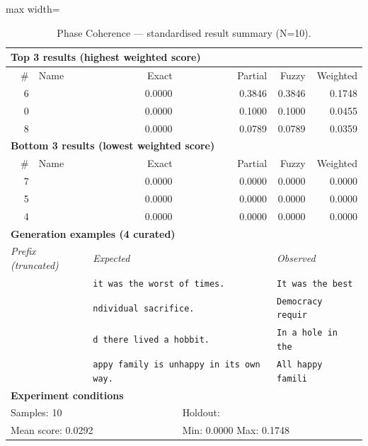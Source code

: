 \begin{table}[htbp]
\centering
\caption{Phase Coherence — standardised result summary (N=10).}
\label{tab:phase_coherence_summary}
\begin{adjustbox}{max width=\textwidth}
\begin{tabular}{r p{5cm} r r r r}
\toprule
\multicolumn{6}{l}{\textbf{Top 3 results (highest weighted score)}} \\
\midrule
\# & Name & Exact & Partial & Fuzzy & Weighted \\
\midrule
6 &  & 0.0000 & 0.3846 & 0.3846 & 0.1748 \\
0 &  & 0.0000 & 0.1000 & 0.1000 & 0.0455 \\
8 &  & 0.0000 & 0.0789 & 0.0789 & 0.0359 \\
\midrule
\multicolumn{6}{l}{\textbf{Bottom 3 results (lowest weighted score)}} \\
\midrule
\# & Name & Exact & Partial & Fuzzy & Weighted \\
\midrule
7 &  & 0.0000 & 0.0000 & 0.0000 & 0.0000 \\
5 &  & 0.0000 & 0.0000 & 0.0000 & 0.0000 \\
4 &  & 0.0000 & 0.0000 & 0.0000 & 0.0000 \\
\midrule
\multicolumn{6}{l}{\textbf{Generation examples (4 curated)}} \\
\midrule
\multicolumn{2}{l}{\textit{Prefix (truncated)}} & \multicolumn{2}{l}{\textit{Expected}} & \multicolumn{2}{l}{\textit{Observed}} \\
\midrule
\multicolumn{2}{l}{\texttt{}} & \multicolumn{2}{l}{\texttt{it was the worst of times.}} & \multicolumn{2}{l}{\texttt{It was the best}} \\
\multicolumn{2}{l}{\texttt{}} & \multicolumn{2}{l}{\texttt{ndividual sacrifice.}} & \multicolumn{2}{l}{\texttt{Democracy requir}} \\
\multicolumn{2}{l}{\texttt{}} & \multicolumn{2}{l}{\texttt{d there lived a hobbit.}} & \multicolumn{2}{l}{\texttt{In a hole in the}} \\
\multicolumn{2}{l}{\texttt{}} & \multicolumn{2}{l}{\texttt{appy family is unhappy in its own way.}} & \multicolumn{2}{l}{\texttt{All happy famili}} \\
\midrule
\multicolumn{6}{l}{\textbf{Experiment conditions}} \\
\midrule
\multicolumn{3}{l}{Samples: 10} & \multicolumn{3}{l}{Holdout: } \\
\multicolumn{3}{l}{Mean score: 0.0292} & \multicolumn{3}{l}{Min: 0.0000 \quad Max: 0.1748} \\

\end{tabular}
\end{adjustbox}
\end{table}
